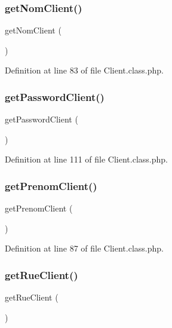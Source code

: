 \subsubsection{\texorpdfstring{get\+Nom\+Client()}{getNomClient()}}
{\footnotesize\ttfamily get\+Nom\+Client (\begin{DoxyParamCaption}{ }\end{DoxyParamCaption})}



Definition at line 83 of file Client.\+class.\+php.

\mbox{\label{class_client_a74d3b4554f5091a5feb275e053cf5ef0}} 
\subsubsection{\texorpdfstring{get\+Password\+Client()}{getPasswordClient()}}
{\footnotesize\ttfamily get\+Password\+Client (\begin{DoxyParamCaption}{ }\end{DoxyParamCaption})}



Definition at line 111 of file Client.\+class.\+php.

\mbox{\label{class_client_a2d704dcd57b25d7f08fbb2958dcfb9e5}} 
\subsubsection{\texorpdfstring{get\+Prenom\+Client()}{getPrenomClient()}}
{\footnotesize\ttfamily get\+Prenom\+Client (\begin{DoxyParamCaption}{ }\end{DoxyParamCaption})}



Definition at line 87 of file Client.\+class.\+php.

\mbox{\label{class_client_a5be4509d3fc4544cb071c916271faba8}} 
\subsubsection{\texorpdfstring{get\+Rue\+Client()}{getRueClient()}}
{\footnotesize\ttfamily get\+Rue\+Client (\begin{DoxyParamCaption}{ }\end{DoxyParamCaption})}



